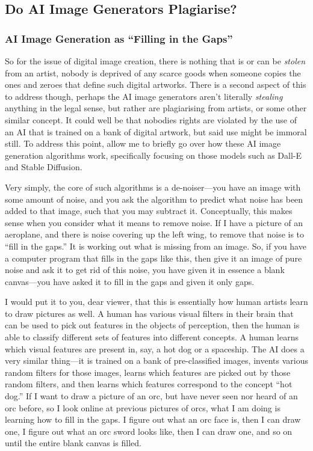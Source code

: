 \documentclass[11pt]{article}
\begin{document}
\subsection*{Do AI Image Generators Plagiarise?}
\label{sec:org11e1ed6}
\subsubsection*{AI Image Generation as ``Filling in the Gaps''}
\label{sec:org4810594}
So for the issue of digital image creation, there is nothing that is or can be \emph{stolen} from an artist, nobody is deprived of any scarce goods when someone copies the ones and zeroes that define such digital artworks. There is a second aspect of this to address though, perhaps the AI image generators aren't literally \emph{stealing} anything in the legal sense, but rather are plagiarising from artists, or some other similar concept. It could well be that nobodies rights are violated by the use of an AI that is trained on a bank of digital artwork, but said use might be immoral still. To address this point, allow me to briefly go over how these AI image generation algorithms work, specifically focusing on those models such as Dall-E and Stable Diffusion.

Very simply, the core of such algorithms is a de-noiser---you have an image with some amount of noise, and you ask the algorithm to predict what noise has been added to that image, such that you may subtract it. Conceptually, this makes sense when you consider what it means to remove noise. If I have a picture of an aeroplane, and there is noise covering up the left wing, to remove that noise is to ``fill in the gaps.'' It is working out what is missing from an image. So, if you have a computer program that fills in the gaps like this, then give it an image of pure noise and ask it to get rid of this noise, you have given it in essence a blank canvas---you have asked it to fill in the gaps and given it only gaps.

I would put it to you, dear viewer, that this is essentially how human artists learn to draw pictures as well. A human has various visual filters in their brain that can be used to pick out features in the objects of perception, then the human is able to classify different sets of features into different concepts. A human learns which visual features are present in, say, a hot dog or a spaceship. The AI does a very similar thing---it is trained on a bank of pre-classified images, invents various random filters for those images, learns which features are picked out by those random filters, and then learns which features correspond to the concept ``hot dog.'' If I want to draw a picture of an orc, but have never seen nor heard of an orc before, so I look online at previous pictures of orcs, what I am doing is learning how to fill in the gaps. I figure out what an orc face is, then I can draw one, I figure out what an orc sword looks like, then I can draw one, and so on until the entire blank canvas is filled.
\end{document}

